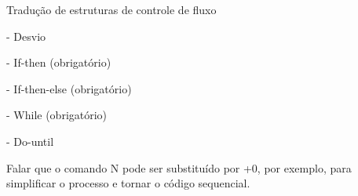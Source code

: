 
Tradução de estruturas de controle de fluxo

- Desvio

- If-then (obrigatório)

- If-then-else (obrigatório)

- While (obrigatório)

- Do-until

Falar que o comando {N} pode ser substituído por +0, por exemplo, para simplificar o processo e tornar o código sequencial.
